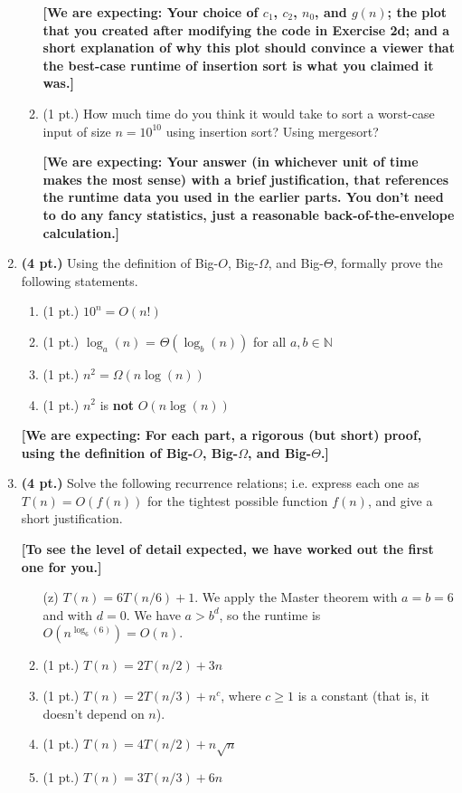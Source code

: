 \documentclass{article}
\begin{document}
\begin{enumerate}
\begin{enumerate}
        \textbf{[We are expecting: Your choice of $c_1$, $c_2$, $n_0$, and $g(n)$;
          the plot that you created after modifying the code in Exercise 2d; and a
          short explanation of why this plot should convince a viewer that the
          best-case runtime of insertion sort is what you claimed it was.]}
      \item (1 pt.) How much time do you think it would take to sort a worst-case
        input of size $n = 10^{10}$ using insertion sort? Using mergesort?

        \textbf{[We are expecting: Your answer (in whichever unit of time makes the
        most sense) with a brief justification, that references the runtime data you
        used in the earlier parts. You don't need to do any fancy statistics, just a
        reasonable back-of-the-envelope calculation.]}
    \end{enumerate}

  \newpage

  \item \textbf{(4 pt.)} Using the definition of Big-$O$, Big-$\Omega$, and Big-$\Theta$,
    formally prove the following statements.
    \begin{enumerate}
      \item (1 pt.) $10^n = O(n!)$
      \item (1 pt.) $\log_a(n)$ = $\Theta(\log_b(n))$ for all $a, b \in \mathbb{N}$
      \item (1 pt.) $n^2 = \Omega(n \log(n))$
      \item (1 pt.) $n^2$ is \textbf{not} $O(n \log(n))$
    \end{enumerate}
    
    \textbf{[We are expecting: For each part, a rigorous (but short) proof,
      using the definition of Big-$O$, Big-$\Omega$, and Big-$\Theta$.]}

  \item \textbf{(4 pt.)} Solve the following recurrence relations;
    i.e. express each one as $T(n) = O(f(n))$ for the tightest possible function
    $f(n)$, and give a short justification.
    
    \textbf{[To see the level of detail expected, we have worked out the first
    one for you.]}
    
    \begin{enumerate}
      \item[(z)] $T(n) = 6T(n/6) + 1$.  We apply the Master theorem with
        $a = b = 6$ and with $d = 0$.  We have $a > b^d$, so the runtime is
        $O(n^{\log_6(6)}) = O(n)$.
      \item (1 pt.) $T(n) = 2 T(n/2) + 3n$
      \item (1 pt.) $T(n) = 2 T(n/3) + n^c$, where $c \geq 1$ is a constant (that is, it
        doesn't depend on $n$).
      \item (1 pt.) $T(n) = 4 T(n/2) + n \sqrt{n}$
      \item (1 pt.) $T(n) = 3 T(n/3) + 6n$
    \end{enumerate}

\end{enumerate}
\end{document}
